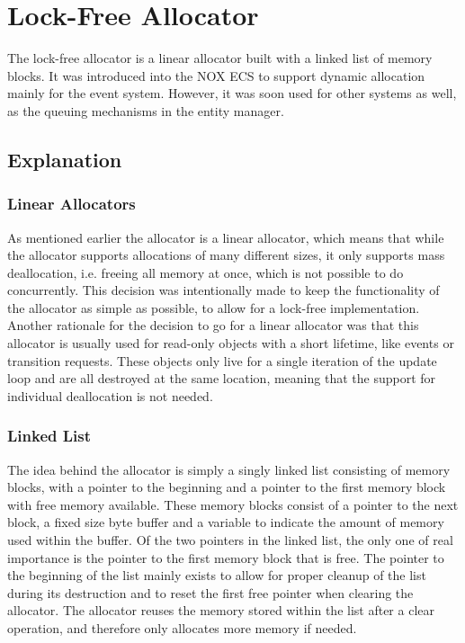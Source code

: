 \section{Lock-Free Allocator}
\label{subsec:detailed_lock_free_allocator}
The lock-free allocator is a linear allocator built with a linked list of memory blocks.
It was introduced into the NOX ECS to support dynamic allocation mainly for the event system. However, it was soon used for other systems as well, as the queuing mechanisms in the entity manager.

\subsection{Explanation}
\subsubsection{Linear Allocators}
As mentioned earlier the allocator is a linear allocator, which means that while the allocator supports allocations of many different sizes,
it only supports mass deallocation, i.e. freeing all memory at once, which is not possible to do concurrently.
This decision was intentionally made to keep the functionality of the allocator as simple as possible, to allow for a lock-free implementation.
Another rationale for the decision to go for a linear allocator was that this allocator is usually used for read-only objects with a short lifetime, like events or transition requests.
These objects only live for a single iteration of the update loop and are all destroyed at the same location, meaning that the support for individual deallocation is not needed.

\subsubsection{Linked List}
The idea behind the allocator is simply a singly linked list consisting of memory blocks, with a pointer to the beginning and a pointer to the first memory block with free memory available.
These memory blocks consist of a pointer to the next block, a fixed size byte buffer and a variable to indicate the amount of memory used within the buffer.
Of the two pointers in the linked list, the only one of real importance is the pointer to the first
memory block that is free.
The pointer to the beginning of the list mainly exists to allow for proper cleanup of the list during its destruction and to reset the first free pointer when clearing the allocator.
The allocator reuses the memory stored within the list after a clear operation, and therefore only
allocates more memory if needed.

